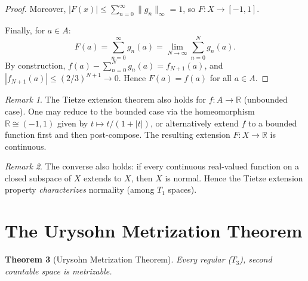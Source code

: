\documentclass[11pt,a4paper,twoside]{book}
\newtheorem{theorem}{Theorem}[section]
\theoremstyle{remark}
\newtheorem{remark}[theorem]{Remark}
\theoremstyle{definition}
\theoremstyle{definition}
\begin{document}
\begin{proof}
Moreover, $|F(x)|\le\sum_{n=0}^{\infty}\|g_n\|_\infty = 1$, so
$F\colon X\to[-1,1]$.

Finally, for $a\in A$:
\[
  F(a) = \sum_{n=0}^{\infty}g_n(a)
       = \lim_{N\to\infty}\sum_{n=0}^{N}g_n(a).
\]
By construction, $f(a)-\sum_{n=0}^{N}g_n(a)=f_{N+1}(a)$, and
$|f_{N+1}(a)|\le(2/3)^{N+1}\to 0$.  Hence $F(a)=f(a)$ for all
$a\in A$.
\end{proof}

\begin{remark}
\label{rem:tietze-unbounded}
The Tietze extension theorem also holds for $f\colon A\to\mathbb{R}$
(unbounded case).  One may reduce to the bounded case via the
homeomorphism $\mathbb{R}\cong(-1,1)$ given by $t\mapsto t/(1+|t|)$,
or alternatively extend $f$ to a bounded function first and then
post-compose.  The resulting extension $F\colon X\to\mathbb{R}$ is
continuous.
\end{remark}

\begin{remark}
\label{rem:tietze-converse}
The converse also holds: if every continuous real-valued function on a
closed subspace of $X$ extends to $X$, then $X$ is normal.  Hence the
Tietze extension property \emph{characterizes} normality (among $T_1$
spaces).
\end{remark}

\section{The Urysohn Metrization Theorem}
\label{sec:urysohn-metrization}

\begin{theorem}[Urysohn Metrization Theorem]
\label{thm:urysohn-metrization}
Every regular ($T_3$), second
countable space is metrizable.
\end{theorem}
\end{document}
